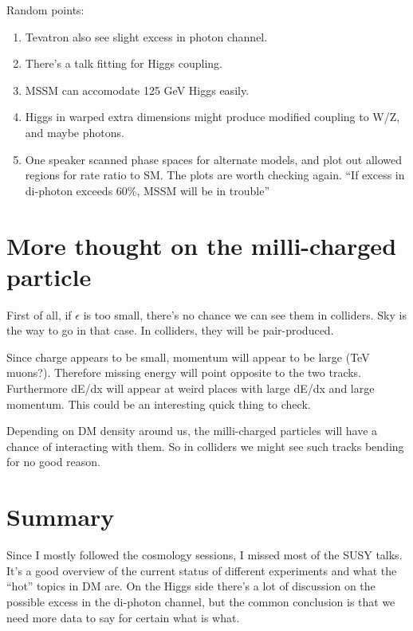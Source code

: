 \documentclass{fheadnote}
\begin{document}
Random points:
\begin{enumerate}
\item Tevatron also see slight excess in photon channel.
\item There's a talk fitting for Higgs coupling.
\item MSSM can accomodate 125 GeV Higgs easily.
\item Higgs in warped extra dimensions might produce modified coupling to W/Z, and maybe photons.
\item One speaker scanned phase spaces for alternate models, and plot out allowed regions for
rate ratio to SM.  The plots are worth checking again.  ``If excess in di-photon exceeds 60\%,
MSSM will be in trouble''
\end{enumerate}

\section{More thought on the milli-charged particle}

First of all, if $\epsilon$ is too small, there's no chance we can see them in colliders.
Sky is the way to go in that case.
In colliders, they will be pair-produced.

Since charge appears to be small, momentum will appear to be large (TeV muons?).
Therefore missing energy will point opposite to the two tracks.
Furthermore dE/dx will appear at weird places with large dE/dx and large momentum.
This could be an interesting quick thing to check.

Depending on DM density around us, the milli-charged particles will have a chance
of interacting with them.  So in colliders we might see such tracks bending for
no good reason.


\section{Summary}

Since I mostly followed the cosmology sessions, I missed most of the SUSY talks.
It's a good overview of the current status of different experiments and what the ``hot''
topics in DM are.
On the Higgs side there's a lot of discussion on the possible excess in the di-photon channel,
but the common conclusion is that we need more data to say for certain what is what.



 
\pagebreak
\end{document}
